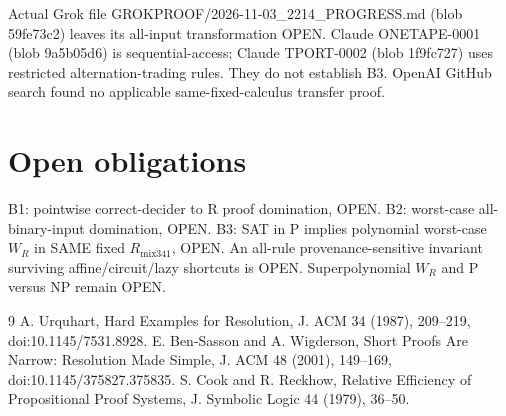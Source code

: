 \documentclass[11pt]{article}
\begin{document}
Actual Grok file GROKPROOF/2026-11-03\_2214\_PROGRESS.md (blob 59fe73c2) leaves its all-input transformation OPEN. Claude ONETAPE-0001 (blob 9a5b05d6) is sequential-access; Claude TPORT-0002 (blob 1f9fc727) uses restricted alternation-trading rules. They do not establish B3. OpenAI GitHub search found no applicable same-fixed-calculus transfer proof.

\section*{Open obligations}
B1: pointwise correct-decider to R proof domination, OPEN. B2: worst-case all-binary-input domination, OPEN. B3: SAT in P implies polynomial worst-case $W_R$ in SAME fixed $R_{\mathrm{mix341}}$, OPEN. An all-rule provenance-sensitive invariant surviving affine/circuit/lazy shortcuts is OPEN. Superpolynomial $W_R$ and P versus NP remain OPEN.

\begin{thebibliography}{9}
 A. Urquhart, Hard Examples for Resolution, J. ACM 34 (1987), 209--219, doi:10.1145/7531.8928.
 E. Ben-Sasson and A. Wigderson, Short Proofs Are Narrow: Resolution Made Simple, J. ACM 48 (2001), 149--169, doi:10.1145/375827.375835.
 S. Cook and R. Reckhow, Relative Efficiency of Propositional Proof Systems, J. Symbolic Logic 44 (1979), 36--50.
\end{thebibliography}
\end{document}
